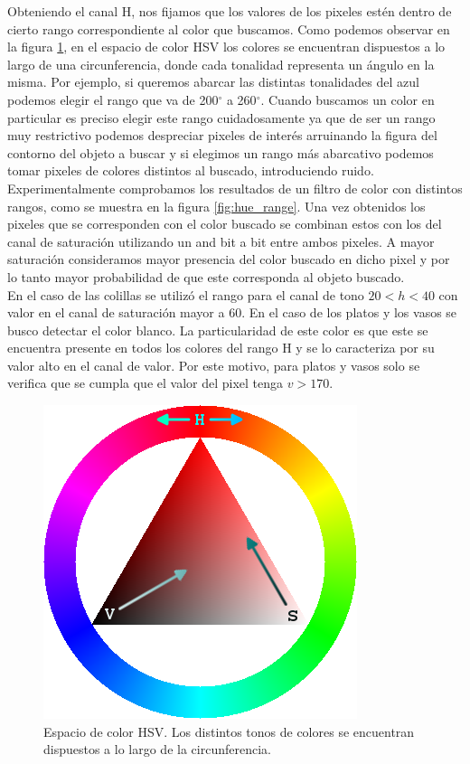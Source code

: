 Obteniendo el canal H, nos fijamos que los valores de los pixeles 
estén dentro de cierto rango correspondiente al color que buscamos. 
Como podemos observar en la figura \ref{fig:hsv_space}, en el espacio 
de color HSV los colores se encuentran dispuestos a lo largo de una 
circunferencia, donde cada tonalidad representa un ángulo en la misma. 
Por ejemplo, si queremos abarcar las distintas tonalidades del azul 
podemos elegir el rango que va de 200$^\circ$ a 260$^\circ$. Cuando 
buscamos un color en particular  es preciso elegir este rango 
cuidadosamente ya que de ser un rango muy restrictivo podemos 
despreciar pixeles de interés arruinando la figura del contorno del 
objeto a buscar y si elegimos un rango más abarcativo podemos tomar 
pixeles de colores distintos al buscado, introduciendo ruido. 
Experimentalmente comprobamos los resultados de un filtro de color con 
distintos rangos, como se muestra  en la figura \ref{fig:hue_range}. 
Una vez obtenidos los pixeles que se corresponden con el color buscado 
se combinan estos con los del canal de saturación utilizando un and 
bit a bit entre ambos pixeles. A mayor saturación consideramos mayor 
presencia del color buscado en dicho pixel y por lo tanto mayor 
probabilidad de que este corresponda al objeto buscado. \\
\indent En el caso de las colillas se utilizó el rango para el canal de tono 
$20<h<40$ con valor en el canal de saturación mayor a 60. En el caso 
de los platos y los vasos se busco detectar el color blanco. La 
particularidad de este color es que este se encuentra presente en 
todos los colores del rango H y se lo caracteriza por su valor alto en 
el canal de valor. Por este motivo, para platos y vasos solo se verifica que 
se cumpla que el valor del pixel tenga $v>170$.
\begin{figure}[tpb]
\begin{center}
  \includegraphics[scale=0.4]{figuras/hsv_triangle.png}
\end{center}
  \caption{\small Espacio de color HSV. Los distintos tonos de colores se encuentran dispuestos a lo largo de la circunferencia.}
  \label{fig:hsv_space}
\end{figure}

